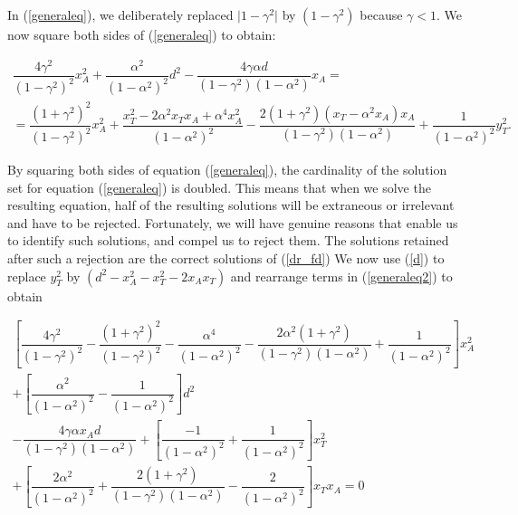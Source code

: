 In (\ref{generaleq}), we deliberately replaced $\lvert1-\gamma^{2}\rvert$ by $(1-\gamma^{2})$ because $\gamma<1$.
We now square both sides of (\ref{generaleq}) to obtain:

\begin{equation}
\begin{split}
\dfrac{4\gamma^{2}}{(1-\gamma^{2})^{2}}x_{A}^{2}
+\dfrac{\alpha^{2}}{(1-\alpha^{2})^{2}} d^{2}
-\dfrac{4\gamma\alpha d}{(1-\gamma^{2})(1-\alpha^{2})}x_{A}=\\
=\dfrac{(1+\gamma^{2})^{2}}{(1-\gamma^{2})^{2}}x_{A}^{2}
+\dfrac{x_{T}^{2}-2\alpha^{2} x_{T} x_{A}+\alpha^{4} x_{A}^{2} }{(1-\alpha^{2})^{2}}
-\dfrac{2(1+\gamma^{2})(x_{T}-\alpha^{2}x_{A})x_{A}}{(1-\gamma^{2})(1-\alpha^{2})}
+\dfrac{1}{(1-\alpha^{2})^{2}}y_{T}^{2}.
\end{split}
\label{generaleq2}
\end{equation}

By squaring both sides of equation (\ref{generaleq}), the cardinality of the solution set for equation (\ref{generaleq}) is doubled. This means that when we solve the resulting equation, half of the resulting solutions will be extraneous or irrelevant and have to be rejected. Fortunately, we will have genuine reasons that enable us to identify such solutions, and compel us to reject them. The solutions retained after such a rejection are the correct solutions of (\ref{dr_fd})
We now use (\ref{d}) to replace $y_{T}^{2}$ by $(d^{2}-x_{A}^{2}-x_{T}^{2}-2x_{A}x_{T})$ and rearrange terms in (\ref{generaleq2}) to obtain

\begin{equation}
\begin{split}
[\dfrac{4\gamma^{2}}{(1-\gamma^{2})^{2}}-\dfrac{(1+\gamma^{2})^{2}}{(1-\gamma^{2})^{2}}-\dfrac{\alpha^{4}}{(1-\alpha^{2})^{2}}-\dfrac{2\alpha^{2}(1+\gamma^{2})}{(1-\gamma^{2})(1-\alpha^{2})}+\dfrac{1}{(1-\alpha^{2})^{2}}]x_{A}^{2}\\
+[\dfrac{\alpha^{2}}{(1-\alpha^{2})^{2}}- \dfrac{1}{(1-\alpha^{2})^{2}}]d^{2}\\
-\dfrac{4\gamma\alpha x_{A}d}{(1-\gamma^{2})(1-\alpha^{2})}
+[\dfrac{-1}{(1-\alpha^{2})^{2}}+\dfrac{1}{(1-\alpha^{2})^{2}}]x_{T}^{2}\\
+[\dfrac{2\alpha^{2}}{(1-\alpha^{2})^{2}}+\dfrac{2(1+\gamma^{2})}{(1-\gamma^{2})(1-\alpha^{2})}-\dfrac{2}{(1-\alpha^{2})^{2}}]x_{T}x_{A}=0
\end{split}
\label{generaleq33}
\end{equation}


